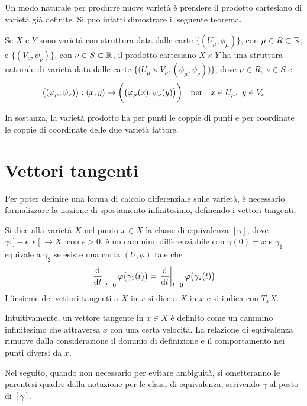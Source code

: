 Un modo naturale per produrre nuove varietà è prendere il prodotto cartesiano di varietà già definite. Si può infatti dimostrare il seguente teorema.
\begin{theorem}
  Se $X$ e $Y$ sono varietà con struttura data dalle carte $\big\lbrace(U_{\mu}, \phi_{\mu})\big\rbrace$, con $\mu \in R \subset \mathbb{R}$, e $\big\lbrace (V_{\nu}, \psi_{\nu})\big\rbrace$, con $\nu \in S \subset  \mathbb{R}$, il prodotto cartesiano $X \times Y$ ha una struttura naturale di varietà data dalle carte $\Big\lbrace\big( U_{\mu} \times V_{\nu}, (\phi_{\mu},\psi_{\nu})\big)\Big\rbrace$, dove $\mu \in  R,\ \nu \in S$ e \begin{equation*}
    \big((\phi_{\mu},\psi_{\nu})\big): (x,y) \mapsto \bigg(\big(\phi_{\mu}(x),\psi_{\nu}(y)\big)\bigg) \qqtext{per} x \in U_{\mu},\ y \in  V_{\nu}
  \end{equation*} 
\end{theorem}
\begin{remark}
  In sostanza, la varietà prodotto ha per punti le coppie di punti e per coordinate le coppie di coordinate delle due varietà fattore.
\end{remark}

\section{Vettori tangenti}
Per poter definire una forma di calcolo differenziale sulle varietà, è necessario formalizzare la nozione di spostamento infinitesimo, definendo i vettori tangenti.

\begin{definition}
  Si dice  alla varietà $X$ nel punto $x \in  X$ la classe di equivalenza $[\gamma]$, dove $\gamma:]-\epsilon,\epsilon\;[\ \to X$, con $\epsilon > 0$, è un cammino differenziabile con $\gamma(0) = x$ e $\gamma_1$ equivale a $\gamma_2$ se esiste una carta $(U, \phi)$ tale che \begin{equation*}
  \eval{\dv{t}}_{t=0} \phi \big(\gamma_1(t)\big) = \eval{\dv{t}}_{t=0} \phi\big(\gamma_2(t)\big)
  \end{equation*} 
  L'insieme dei vettori tangenti a $X$ in $x$ si dice  a $X$ in $x$ e si indica con $T_x X$.
\end{definition}
\begin{remark}
  Intuitivamente, un vettore tangente in $x \in X$ è definito come un cammino infinitesimo che attraversa $x$ con una certa velocità. La relazione di equivalenza rimuove dalla considerazione il dominio di definizione e il comportamento nei punti diversi da $x$.
\end{remark}
Nel seguito, quando non necessario per evitare ambiguità, si ometteranno le parentesi quadre dalla notazione per le classi di equivalenza, scrivendo $\gamma$ al posto di $[\gamma]$.

